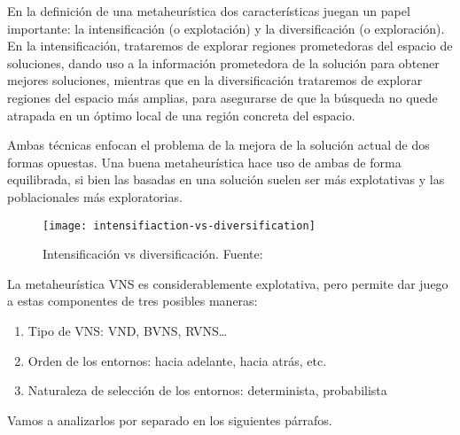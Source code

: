 En la definición de una metaheurística dos características juegan un papel importante: la intensificación (o explotación) y la diversificación (o exploración). En la intensificación, trataremos de explorar regiones prometedoras del espacio de soluciones, dando uso a la información prometedora de la solución para obtener mejores soluciones, mientras que en la diversificación trataremos de explorar regiones del espacio más amplias, para asegurarse de que la búsqueda no quede atrapada en un óptimo local de una región concreta del espacio.

Ambas técnicas enfocan el problema de la mejora de la solución actual de dos formas opuestas. Una buena metaheurística
hace uso de ambas de forma equilibrada, si bien las basadas en una solución suelen ser más explotativas y las poblacionales más exploratorias.

\begin{figure}
    \centering    \texttt{[image: intensifiaction-vs-diversification]}
    \caption[Intensificación vs diversificación]{Intensificación vs diversificación. Fuente:~\cite{sota:metaheuristicas-design-impl}}
    \label{fig:intensifiaction-vs-diversification}
\end{figure}

La metaheurística VNS es considerablemente explotativa, pero permite dar juego a estas componentes de tres posibles maneras:
\begin{enumerate}[label=\alph*.]
    \item Tipo de VNS: VND, BVNS, RVNS\ldots
    \item Orden de los entornos: hacia adelante, hacia atrás, etc.
    \item Naturaleza de selección de los entornos: determinista, probabilista
\end{enumerate}

Vamos a analizarlos por separado en los siguientes párrafos.


